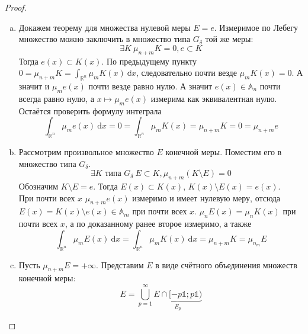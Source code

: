 \documentclass{article}
\begin{document}
\begin{proof}
\begin{enumerate}[a.]
            Хорошо. Тогда заметим, что $G_{k+1}(x)\subset G_k(x)$. Далее:
            $$
            \int_{\mathbb R^n}\mu_mG_1(x)~\mathrm dx=\mu_{n+m}G_1<+\infty
            $$
            Значит почти везде $\mu_mG_1(x)<+\infty$. То есть при почти всех $x$
            $$
            \mu_mK(x)=\lim\limits_{N\to\infty}\mu_mG_N(x)
            $$
            То есть $K(x)$ измеримо как преде измеримых (по полноте меры Лебега).\\
            Проверим формулу:
            $$
            \int_{\mathbb R^n}\mu_mK(x)~\mathrm dx=\int_{\mathbb R_n}\lim\limits_{N\to\infty}\mu_mG_n(x)~\mathrm dx\overset{\ref{Теорема Лебега о мажорированной сходимости}}=\lim\limits_{N\to\infty}\int_{\mathbb R_n}\mu_mG_N(x)~\mathrm dx=\lim\limits_{N\to\infty}\mu_{n+m}G_N\overset{\ref{Непрерывность меры}}=\mu_{n+m}K
            $$
            \item Докажем теорему для множества нулевой меры $E=e$. Измеримое по Лебегу множество можно заключить в множество типа $G_\delta$ той же меры:
            $$
            \exists K~\mu_{n+m}K=0,e\subset K
            $$
            Тогда $e(x)\subset K(x)$. По предыдущему пункту $0=\mu_{n+m}K=\int_{\mathbb R^n}\mu_m K(x)~\mathbb dx$, следовательно почти везде $\mu_m K(x)=0$. А значит и $\mu_m e(x)$ почти везде равно нулю. А значит $e(x)\in\mathbb A_n$ почти всегда равно нулю, а $x\mapsto\mu_m e(x)$ измерима как эквивалентная нулю. Остаётся проверить формулу интеграла
            $$
            \int_{\mathbb R^n}\mu_me(x)~\mathrm dx=0=\int_{\mathbb R^n}\mu_mK(x)=\mu_{n+m}K=0=\mu_{n+m}e
            $$
            \item Рассмотрим произвольное множество $E$ конечной меры. Поместим его в множество типа $G_\delta$.
            $$
            \exists K\text{ типа }G_\delta~E\subset K,\mu_{n+m}(K\setminus E)=0
            $$
            Обозначим $K\setminus E=e$. Тогда $E(x)\subset K(x)$, $K(x)\setminus E(x)=e(x)$.\\
            При почти всех $x$ $\mu_{n+m}e(x)$ измеримо и имеет нулевую меру, отсюда $E(x)=K(x)\setminus e(x)\in\mathbb A_m$ при почти всех $x$. $\mu_n E(x)=\mu_n K(x)$ при почти всех $x$, а по доказанному ранее второе измеримо, а также
            $$
            \int_{\mathbb R^n}\mu_mE(x)~\mathrm dx=\int_{\mathbb R^n}\mu_mK(x)~\mathrm dx=\mu_{n+m}K=\mu_{n_m}E
            $$
            \item Пусть $\mu_{n+m}E=+\infty$. Представим $E$ в виде счётного объединения множеств конечной меры:
            $$
            E=\bigcup\limits_{p=1}^\infty\underbrace{E\cap[-p\mathbb1;p\mathbb1)}_{E_p}
$$
\end{enumerate}
\end{proof}
\end{document}
